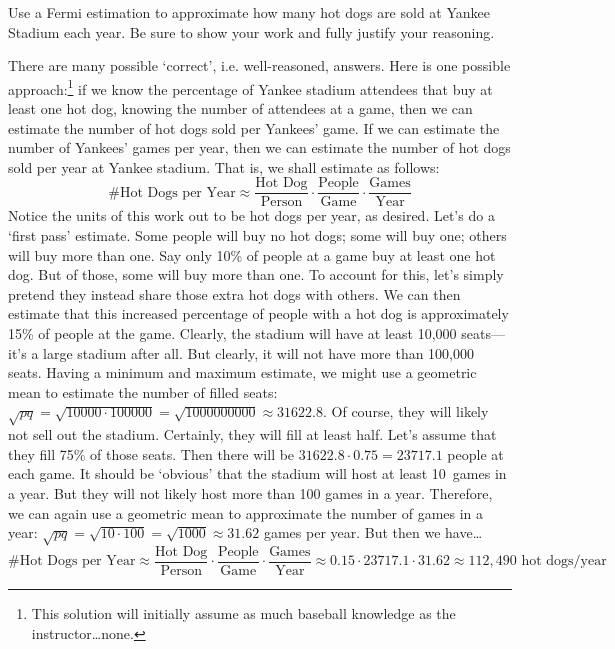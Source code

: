 \documentclass[11pt,letterpaper]{article}
\begin{document}
\newpage



 Use a Fermi estimation to approximate how many hot dogs are sold at Yankee Stadium each year. Be sure to show your work and fully justify your reasoning. \pspace

\sol There are many possible `correct', i.e. well-reasoned, answers. Here is one possible approach:\footnote{This solution will initially assume as much baseball knowledge as the instructor\dots none.} if we know the percentage of Yankee stadium attendees that buy at least one hot dog, knowing the number of attendees at a game, then we can estimate the number of hot dogs sold per Yankees' game. If we can estimate the number of Yankees' games per year, then we can estimate the number of hot dogs sold per year at Yankee stadium. That is, we shall estimate as follows:
	\[
	\text{\# Hot Dogs per Year} \approx \dfrac{\text{Hot Dog}}{\text{Person}} \cdot \dfrac{\text{People}}{\text{Game}} \cdot \dfrac{\text{Games}}{\text{Year}}
	\]
Notice the units of this work out to be hot dogs per year, as desired. Let's do a `first pass' estimate. Some people will buy no hot dogs; some will buy one; others will buy more than one. Say only 10\% of people at a game buy at least one hot dog. But of those, some will buy more than one. To account for this, let's simply pretend they instead share those extra hot dogs with others. We can then estimate that this increased percentage of people with a hot dog is approximately 15\% of people at the game. Clearly, the stadium will have at least 10,000 seats---it's a large stadium after all. But clearly, it will not have more than 100,000 seats. Having a minimum and maximum estimate, we might use a geometric mean to estimate the number of filled seats: $\sqrt{pq}= \sqrt{10000 \cdot 100000}= \sqrt{1000000000} \approx 31622.8$. Of course, they will likely not sell out the stadium. Certainly, they will fill at least half. Let's assume that they fill 75\% of those seats. Then there will be $31622.8 \cdot 0.75= 23717.1$ people at each game. It should be `obvious' that the stadium will host at least 10~games in a year. But they will not likely host more than 100 games in a year. Therefore, we can again use a geometric mean to approximate the number of games in a year: $\sqrt{pq}= \sqrt{10 \cdot 100}= \sqrt{1000} \approx 31.62$ games per year. But then we have\dots
	\[
	\text{\# Hot Dogs per Year} \approx \dfrac{\text{Hot Dog}}{\text{Person}} \cdot \dfrac{\text{People}}{\text{Game}} \cdot \dfrac{\text{Games}}{\text{Year}} \approx 0.15 \cdot 23717.1 \cdot 31.62 \approx 112,\!490 \text{ hot dogs/year}
	\] \pspace
\end{document}
